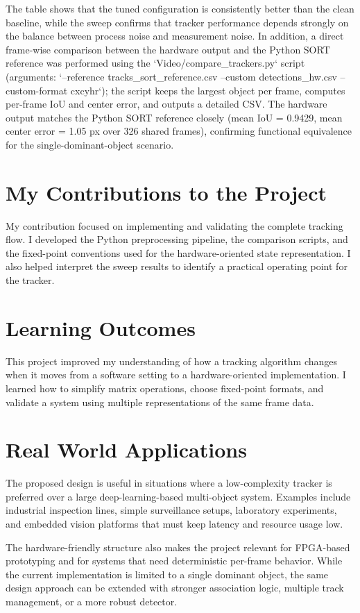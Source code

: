 The table shows that the tuned configuration is consistently better than the clean baseline, while the sweep confirms that tracker performance depends strongly on the balance between process noise and measurement noise. In addition, a direct frame-wise comparison between the hardware output and the Python SORT reference was performed using the `Video/compare_trackers.py` script (arguments: `--reference tracks_sort_reference.csv --custom detections_hw.csv --custom-format cxcyhr`); the script keeps the largest object per frame, computes per-frame IoU and center error, and outputs a detailed CSV. The hardware output matches the Python SORT reference closely (mean IoU = 0.9429, mean center error = 1.05 px over 326 shared frames), confirming functional equivalence for the single-dominant-object scenario.

\section{My Contributions to the Project}
\label{section:my_contribution}
My contribution focused on implementing and validating the complete tracking flow. I developed 
the Python preprocessing pipeline, the comparison scripts, and the fixed-point conventions used 
for the hardware-oriented state representation. I also helped interpret the sweep results to 
identify a practical operating point for the tracker.

\section{Learning Outcomes}\label{section:learnings}
This project improved my understanding of how a tracking algorithm changes when it moves from a 
software setting to a hardware-oriented implementation. I learned how to simplify matrix 
operations, choose fixed-point formats, and validate a system using multiple representations of 
the same frame data.

\section{Real World Applications}
\label{section:real_world_app}
The proposed design is useful in situations where a low-complexity tracker is preferred over a 
large deep-learning-based multi-object system. Examples include industrial inspection lines, 
simple surveillance setups, laboratory experiments, and embedded vision platforms that must keep 
latency and resource usage low.

The hardware-friendly structure also makes the project relevant for FPGA-based prototyping and 
for systems that need deterministic per-frame behavior. While the current implementation is limited 
to a single dominant object, the same design approach can be extended with stronger association 
logic, multiple track management, or a more robust detector.